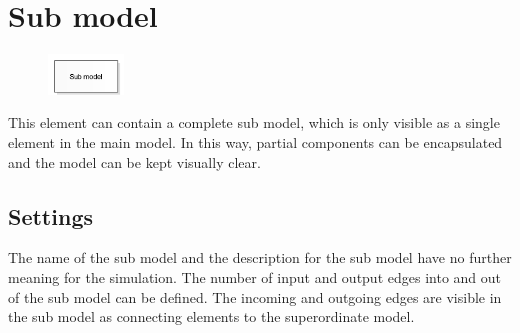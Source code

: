 \section{Sub model}
\label{ref:ModelElementSub}

\begin{figure}
\vspace{-22pt}
\includegraphics[width=2cm]{imageModelElementSub.png}
\vspace{-22pt}
\end{figure}

This element can contain a complete sub model, which is only visible as a single element in the main model.
In this way, partial components can be encapsulated and the model can be kept visually clear.

\subsection*{Settings}

The name of the sub model and the description for the sub model have
no further meaning for the simulation.
The number of input and output edges into and out of the sub model can
be defined. The incoming and outgoing edges are visible in the sub model
as connecting elements to the superordinate model.





